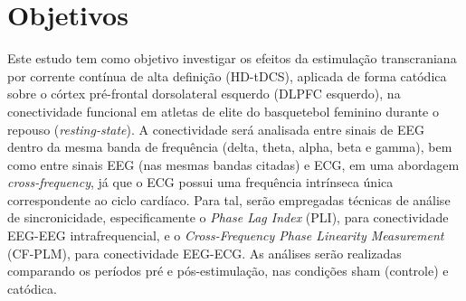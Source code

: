 \chapter{Objetivos}
\label{chap:objetivos}

Este estudo tem como objetivo investigar os efeitos da estimulação transcraniana por corrente contínua de alta definição (HD-tDCS), aplicada de forma catódica sobre o córtex pré-frontal dorsolateral esquerdo (DLPFC esquerdo), na conectividade funcional em atletas de elite do basquetebol feminino durante o repouso (\textit{resting-state}). A conectividade será analisada entre sinais de EEG dentro da mesma banda de frequência (delta, theta, alpha, beta e gamma), bem como entre sinais EEG (nas mesmas bandas citadas) e ECG, em uma abordagem \textit{cross-frequency}, já que o ECG possui uma frequência intrínseca única correspondente ao ciclo cardíaco. Para tal, serão empregadas técnicas de análise de sincronicidade, especificamente o \textit{Phase Lag Index} (PLI), para conectividade EEG-EEG intrafrequencial, e o \textit{Cross-Frequency Phase Linearity Measurement} (CF-PLM), para conectividade EEG-ECG. As análises serão realizadas comparando os períodos pré e pós-estimulação, nas condições sham (controle) e catódica.